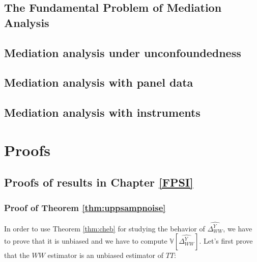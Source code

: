 \documentclass[
]{book}
\newcommand{\var}[1]{\mathbb{V}[ #1 ]}
\theoremstyle{definition}
\theoremstyle{definition}
\theoremstyle{definition}
\theoremstyle{definition}
\theoremstyle{remark}
\begin{document}
\hypertarget{the-fundamental-problem-of-mediation-analysis}{%
\section{The Fundamental Problem of Mediation Analysis}\label{the-fundamental-problem-of-mediation-analysis}}

\hypertarget{mediation-analysis-under-unconfoundedness}{%
\section{Mediation analysis under unconfoundedness}\label{mediation-analysis-under-unconfoundedness}}

\hypertarget{mediation-analysis-with-panel-data}{%
\section{Mediation analysis with panel data}\label{mediation-analysis-with-panel-data}}

\hypertarget{mediation-analysis-with-instruments}{%
\section{Mediation analysis with instruments}\label{mediation-analysis-with-instruments}}

\hypertarget{appendix-appendix}{%
\appendix}


\hypertarget{proofs}{%
\chapter{Proofs}\label{proofs}}

\hypertarget{proofs-of-results-in-chapter-reffpsi}{%
\section{Proofs of results in Chapter \ref{FPSI}}\label{proofs-of-results-in-chapter-reffpsi}}

\hypertarget{proofcheb}{%
\subsection{Proof of Theorem \ref{thm:uppsampnoise}}\label{proofcheb}}

In order to use Theorem \ref{thm:cheb} for studying the behavior of \(\hat{\Delta^Y_{WW}}\), we have to prove that it is unbiased and we have to compute \(\var{\hat{\Delta^Y_{WW}}}\).
Let's first prove that the \(WW\) estimator is an unbiased estimator of \(TT\):
\end{document}
